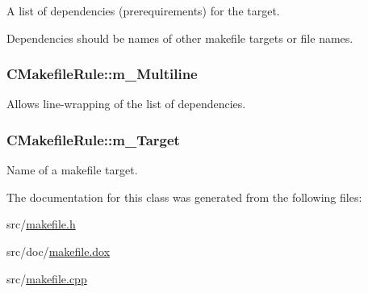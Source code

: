 A list of dependencies (prerequirements) for the target. 

Dependencies should be names of other makefile targets or file names. \hypertarget{classCMakefileRule_a9a2e0ba695a307f15e2f3329b3b198c4}{
\subsubsection[{m\-\_\-\-Multiline}]{\setlength{\rightskip}{0pt plus 5cm}C\-Makefile\-Rule\-::m\-\_\-\-Multiline\hspace{0.3cm}{\ttfamily [private]}}}\label{classCMakefileRule_a9a2e0ba695a307f15e2f3329b3b198c4}


Allows line-\/wrapping of the list of dependencies. 

\hypertarget{classCMakefileRule_ad951eb8f2f582b95e8fff72d77296233}{
\subsubsection[{m\-\_\-\-Target}]{\setlength{\rightskip}{0pt plus 5cm}C\-Makefile\-Rule\-::m\-\_\-\-Target\hspace{0.3cm}{\ttfamily [private]}}}\label{classCMakefileRule_ad951eb8f2f582b95e8fff72d77296233}


Name of a makefile target. 



The documentation for this class was generated from the following files\-:\begin{DoxyCompactItemize}
\item 
src/\hyperlink{makefile_8h}{makefile.\-h}\item 
src/doc/\hyperlink{makefile_8dox}{makefile.\-dox}\item 
src/\hyperlink{makefile_8cpp}{makefile.\-cpp}\end{DoxyCompactItemize}
